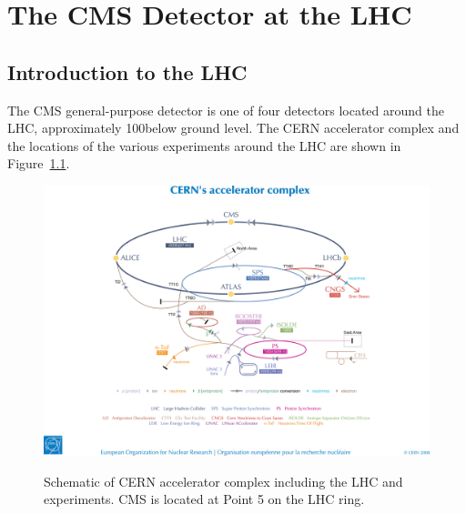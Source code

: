 \chapter{The CMS Detector at the LHC}
\label{c:CMS_Detector}

\section{Introduction to the LHC}
\label{s:Introduction}
The CMS general-purpose detector is one of four detectors located around the LHC, approximately 100\m below
ground level. The CERN accelerator complex and the locations of the various experiments around the LHC are
shown in Figure~\ref{fig:LHC_schematic}.

\begin{figure}[hbtp]
   \centering
     \includegraphics[width=\textwidth]{Chapters/02_Detector/Images/0812015.jpg}\\
     \caption[Schematic of LHC and experiments.]{Schematic of CERN accelerator complex including the LHC and
     experiments.
     CMS is located at Point 5 on the LHC ring.}
     \label{fig:LHC_schematic}
\end{figure}

